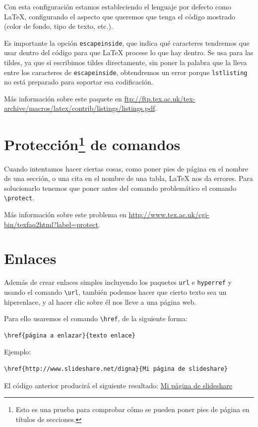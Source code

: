 \documentclass[12pt,a4paper, oneside]{report}
\begin{document}
Con esta configuración estamos estableciendo el lenguaje por defecto como \LaTeX{},  configurando el aspecto que queremos que tenga el código mostrado (color de fondo, tipo de texto, etc.). 

Es importante la opción \verb+escapeinside+, que indica qué caracteres tendremos que usar dentro del código para que \LaTeX{} procese lo que hay dentro. Se usa para las tildes, ya que si escribimos tildes directamente, sin poner la palabra que la lleva entre los caracteres de \verb+escapeinside+, obtendremos un error porque \verb+lstlisting+ no está preparado para soportar esa codificación.

Más información sobre este paquete en \footnotesize{ \url{ftp://ftp.tex.ac.uk/tex-archive/macros/latex/contrib/listings/listings.pdf}}.



\section{Protección\protect \footnote{Esto es una prueba para comprobar cómo se pueden poner pies de página en títulos de secciones.} de comandos}

Cuando intentamos hacer ciertas cosas, como poner pies de página en el  nombre de una sección, o una cita en el nombre de una tabla, \LaTeX{} nos da errores. Para solucionarlo tenemos que poner antes del comando problemático el comando \verb+\protect+.

Más información sobre este problema en \url{http://www.tex.ac.uk/cgi-bin/texfaq2html?label=protect}.



\section{Enlaces}

Además de crear enlaces simples incluyendo los paquetes \texttt{url} e \texttt{hyperref} y usando el comando \verb+\url+, también podemos hacer que cierto texto sea un hiperenlace, y al hacer clic sobre él nos lleve a una página web.

Para ello usaremos el comando \verb+\href+, de la siguiente forma: \begin{verbatim}\href{página a enlazar}{texto enlace}\end{verbatim}

Ejemplo: \begin{verbatim}\href{http://www.slideshare.net/digna}{Mi página de slideshare}\end{verbatim} 
El código anterior producirá el siguiente resultado: \href{http://www.slideshare.net/digna}{Mi página de slideshare}
\end{document}
